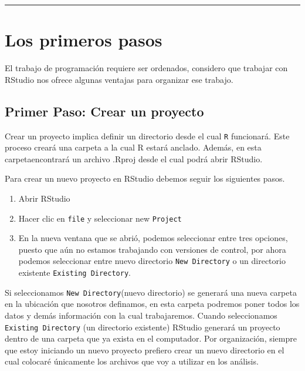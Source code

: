\documentclass[
]{article}
\providecommand{\tightlist}{%
  \setlength{\itemsep}{0pt}\setlength{\parskip}{0pt}}
\begin{document}
\begin{center}\rule{0.5\linewidth}{0.5pt}\end{center}

\hypertarget{los-primeros-pasos}{%
\section{Los primeros pasos}\label{los-primeros-pasos}}

El trabajo de programación requiere ser ordenados, considero que
trabajar con RStudio nos ofrece algunas ventajas para organizar ese
trabajo.

\hypertarget{primer-paso-crear-un-proyecto}{%
\subsection{Primer Paso: Crear un
proyecto}\label{primer-paso-crear-un-proyecto}}

Crear un proyecto implica definir un directorio desde el cual \texttt{R}
funcionará. Este proceso creará una carpeta a la cual R estará anclado.
Además, en esta carpetaencontrará un archivo .Rproj desde el cual podrá
abrir RStudio.

Para crear un nuevo proyecto en RStudio debemos seguir los siguientes
pasos.

\begin{enumerate}
\def\labelenumi{\arabic{enumi}.}
\tightlist
\item
  Abrir RStudio
\item
  Hacer clic en \texttt{file} y seleccionar new \texttt{Project}
\item
  En la nueva ventana que se abrió, podemos seleccionar entre tres
  opciones, puesto que aún no estamos trabajando con versiones de
  control, por ahora podemos seleccionar entre nuevo directorio
  \texttt{New\ Directory} o un directorio existente
  \texttt{Existing\ Directory}.
\end{enumerate}

Si seleccionamos \texttt{New\ Directory}(nuevo directorio) se generará
una nueva carpeta en la ubicación que nosotros definamos, en esta
carpeta podremos poner todos los datos y demás información con la cual
trabajaremos. Cuando seleccionamos \texttt{Existing\ Directory} (un
directorio existente) RStudio generará un proyecto dentro de una carpeta
que ya exista en el computador. Por organización, siempre que estoy
iniciando un nuevo proyecto prefiero crear un nuevo directorio en el
cual colocaré únicamente los archivos que voy a utilizar en los
análisis.
\end{document}
